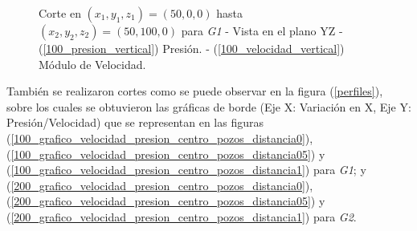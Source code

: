 \documentclass[10pt,a4paper,final]{article}
\begin{document}
%
%
\begin{figure}[H]
   \centering
   \hspace{0.1\linewidth}
    \caption{Corte en $(x_1,y_1,z_1)=(50,0,0)$ hasta $(x_2,y_2,z_2)=(50,100,0)$ para \emph{G1} - Vista en el plano YZ - (\ref{100_presion_vertical}) Presión. - (\ref{100_velocidad_vertical}) Módulo de Velocidad.}
   \label{100_velocidad_presion_vertical}                %
\end{figure}
También se realizaron cortes como se puede observar en la figura (\ref{perfiles}), sobre los cuales se obtuvieron las gráficas de borde (Eje X: Variación en X, Eje Y: Presión/Velocidad) que se representan en las figuras (\ref{100_grafico_velocidad_presion_centro_pozos_distancia0}), (\ref{100_grafico_velocidad_presion_centro_pozos_distancia05}) y (\ref{100_grafico_velocidad_presion_centro_pozos_distancia1}) para \emph{G1}; y (\ref{200_grafico_velocidad_presion_centro_pozos_distancia0}),(\ref{200_grafico_velocidad_presion_centro_pozos_distancia05}) y (\ref{200_grafico_velocidad_presion_centro_pozos_distancia1}) para \emph{G2}.
\end{document}
